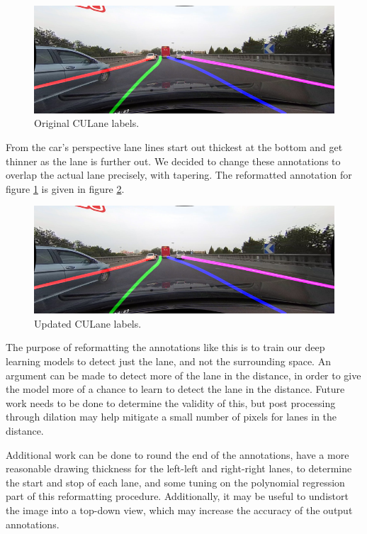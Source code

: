 \documentclass[twoside,twocolumn]{article}
\begin{document}
\begin{figure}
  \includegraphics[width=\linewidth]{calvin3.png}
  \caption{Original CULane labels.}
  \label{fig:og}
\end{figure}

\par From the car's perspective lane lines start out thickest at the bottom and get thinner as the lane is further out. We decided to change these annotations to overlap the actual lane precisely, with tapering. The reformatted annotation for figure \ref{fig:og} is given in figure \ref{fig:updated}.

\begin{figure}
  \includegraphics[width=\linewidth]{calvin3.png}
  \caption{Updated CULane labels.}
  \label{fig:updated}
\end{figure}

\par The purpose of reformatting the annotations like this is to train our deep learning models to detect just the lane, and not the surrounding space. An argument can be made to detect more of the lane in the distance, in order to give the model more of a chance to learn to detect the lane in the distance. Future work needs to be done to determine the validity of this, but post processing through dilation may help mitigate a small number of pixels for lanes in the distance.
\par Additional work can be done to round the end of the annotations, have a more reasonable drawing thickness for the left-left and right-right lanes, to determine the start and stop of each lane, and some tuning on the polynomial regression part of this reformatting procedure. Additionally, it may be useful to undistort the image into a top-down view, which may increase the accuracy of the output annotations.
\end{document}
